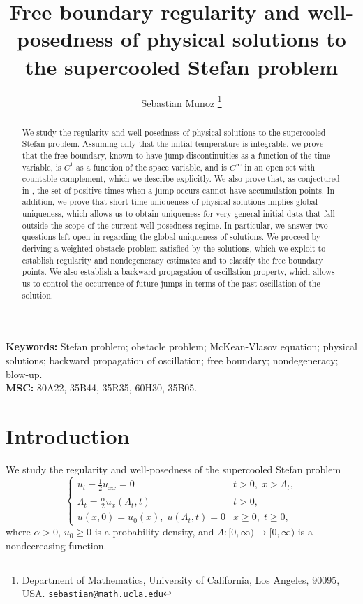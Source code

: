 \documentclass{article}
\title{Free boundary regularity and well-posedness of physical solutions to the supercooled Stefan problem}
\author{Sebastian Munoz \thanks{Department of Mathematics, University of California, Los Angeles, 90095, USA. \texttt{sebastian@math.ucla.edu}}}
\numberwithin{equation}{section}
\numberwithin{figure}{section}
\theoremstyle{plain}
\theoremstyle{plain}
\theoremstyle{plain}
\theoremstyle{plain}
\theoremstyle{definition}
\theoremstyle{remark}
\begin{document}
\maketitle
\begin{abstract}
    We study the regularity and well-posedness of physical solutions to the supercooled Stefan problem. Assuming only that the initial temperature is integrable, we prove that the free boundary, known to have jump discontinuities as a function of the time variable, is $C^1$ as a function of the space variable, and is $C^{\infty}$ in an open set with countable complement, which we describe explicitly. We also prove that, as conjectured in \cite{delarue}, the set of positive times when a jump occurs cannot have accumulation points. In addition, we prove that short-time uniqueness of physical solutions implies global uniqueness, which allows us to obtain uniqueness for very general initial data that fall outside the scope of the current well-posedness regime. In particular, we answer two questions left open in \cite{LedSoj,shkolnikov} regarding the global uniqueness of solutions. We proceed by deriving a weighted obstacle problem satisfied by the solutions, which we exploit to establish regularity and nondegeneracy estimates and to classify the free boundary points. We also establish a backward propagation of oscillation property, which allows us to control the occurrence of future jumps in terms of the past oscillation of the solution. 
\end{abstract}
\noindent \textbf{Keywords:} Stefan problem; obstacle problem; McKean-Vlasov equation;  physical solutions; backward propagation of oscillation;  free boundary; nondegeneracy; blow-up.\\
\noindent \textbf{MSC: } 80A22, 35B44, 35R35, 60H30, 35B05. 

\tableofcontents
\section{Introduction}
We study the regularity and well-posedness of the supercooled Stefan problem
\begin{equation}\begin{cases} \label{supercooled eqs}
    u_t - \frac{1}{2} u_{xx}= 0 & t>0,\; x>\Lambda_t,\\
\dot{\Lambda}_t = \frac{\alpha}{2} u_x(\Lambda_t,t) & t > 0,\\
u(x,0) = u_0(x),\; u(\Lambda_t,t) = 0 & x\geq 0,\; t\geq 0,
\end{cases}
\end{equation}
where $\alpha>0$, $u_0\geq0$ is a probability density, and $\Lambda :[0,\infty)\to [0,\infty)$ is a nondecreasing function.
\end{document}
